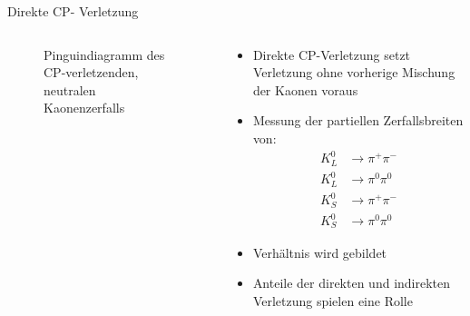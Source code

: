 \documentclass[aspectratio=1610, professionalfonts, 9pt, t]{beamer}
\begin{document}
\begin{frame}{Direkte CP- Verletzung}
\begin{columns}[onlytextwidth]
\begin{column}{0.4\textwidth}
\begin{figure}[ht]
          \caption{Pinguindiagramm des CP-verletzenden, neutralen Kaonenzerfalls}
        \end{figure}
      \end{column}
      \begin{column}{0.5\textwidth}
        \begin{itemize}
          \item Direkte CP-Verletzung setzt Verletzung ohne vorherige Mischung der Kaonen voraus
          \item Messung der partiellen Zerfallsbreiten von:
          \begin{align*}
            K_{L}^0 &\rightarrow \pi^+ \pi^- \\
            K_{L}^0 &\rightarrow \pi^0 \pi^0 \\
            K_{S}^0 &\rightarrow \pi^+ \pi^- \\
            K_{S}^0 &\rightarrow \pi^0 \pi^0
          \end{align*}
          \item Verhältnis wird gebildet
          \item[\rightarrow] Anteile der direkten und indirekten Verletzung spielen eine Rolle
        \end{itemize}
      \end{column}
    \end{columns}
  \end{frame}
\end{document}
